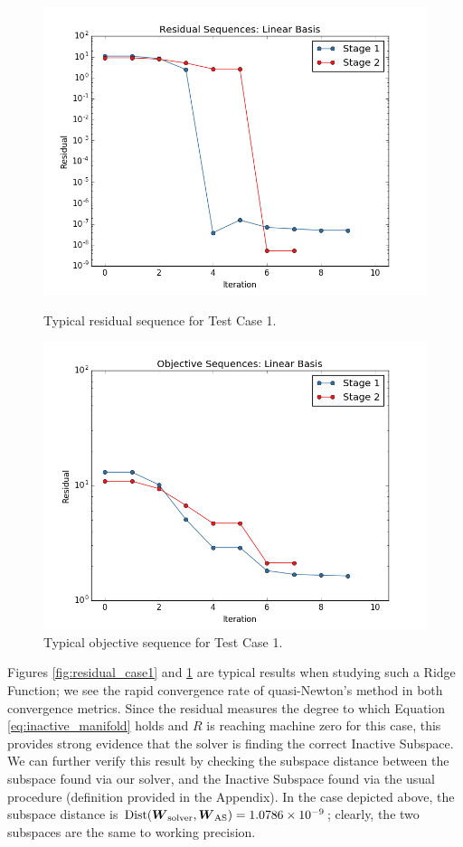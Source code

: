 \documentclass[]{aiaa-tc}%
\begin{document}
\begin{figure}[!ht]
\centering
\begin{minipage}{.50\textwidth}
 \centering
 \includegraphics[width=.8\textwidth]{../images/residual_case1}
 \caption{Typical residual sequence for Test Case 1.}
 \label{fig:residual_case1}
\end{minipage}%
\begin{minipage}{.50\textwidth}
 \centering
 \includegraphics[width=.8\textwidth]{../images/objective_case1}
 \caption{Typical objective sequence for Test Case 1.}
 \label{fig:objective_case1}
\end{minipage}
\end{figure}

Figures \ref{fig:residual_case1} and \ref{fig:objective_case1} are typical results when studying such a Ridge Function; we see the rapid convergence rate of quasi-Newton's method in both convergence metrics. Since the residual measures the degree to which Equation \ref{eq:inactive_manifold} holds and $R$ is reaching machine zero for this case, this provides strong evidence that the solver is finding the correct Inactive Subspace. We can further verify this result by checking the subspace distance between the subspace found via our solver, and the Inactive Subspace found via the usual procedure (definition provided in the Appendix). In the case depicted above, the subspace distance is $\text{Dist}(\boldsymbol{W}_{\text{solver}},\boldsymbol{W}_{\text{AS}})=1.0786\times10^{-9}$; clearly, the two subspaces are the same to working precision.
\end{document}
